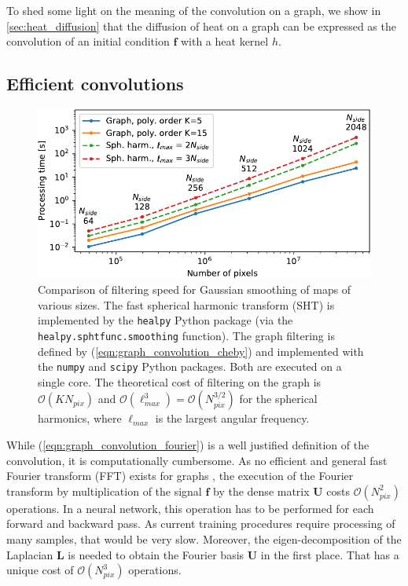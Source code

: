 \documentclass[final,twocolumn,3p,times,sort&compress]{elsarticle}
\newcommand{\eqnref}[1]{(\ref{eqn:#1})}
\renewcommand{\b}[1]{{\bm{#1}}}   %
\newcommand{\1}{\b{1}}              %
\newcommand{\0}{\b{0}}              %
\renewcommand{\L}{\b{L}}
\newcommand{\U}{\b{U}}
\newcommand{\f}{\b{f}}
\newcommand{\bO}{\mathcal{O}}
\begin{document}
To shed some light on the meaning of the convolution on a graph, we show in \ref{sec:heat_diffusion} that the diffusion of heat on a graph can be expressed as the convolution of an initial condition $\f$ with a heat kernel $h$.

\subsection{Efficient convolutions}
\label{sec:efficient_convolution}

\begin{figure}[t!]
    \centering
    \includegraphics[width=\linewidth]{filtering_speed}
    \caption{Comparison of filtering speed for Gaussian smoothing of maps of various sizes.
    The fast spherical harmonic transform (SHT) is implemented by the \texttt{healpy} Python package (via the \texttt{healpy.sphtfunc.smoothing} function).
    The graph filtering is defined by \eqnref{graph_convolution_cheby} and implemented with the \texttt{numpy} and \texttt{scipy} Python packages.
    Both are executed on a single core.
	The theoretical cost of filtering on the graph is $\bO(K N_{pix})$ and $\bO(\ell_{max}^3) = \bO(N_{pix}^{3/2})$ for the spherical harmonics, where $\ell_{max}$ is the largest angular frequency.}
    \label{fig:filtering_speed}
\end{figure}

While \eqnref{graph_convolution_fourier} is a well justified definition of the convolution, it is computationally cumbersome.
As no efficient and general fast Fourier transform (FFT) exists for graphs \citep{le2018fgft}, the execution of the Fourier transform by multiplication of the signal $\f$ by the dense matrix $\U$ costs $\bO(N_{pix}^2)$ operations.
In a neural network, this operation has to be performed for each forward and backward pass.
As current training procedures require processing of many samples, that would be very slow.
Moreover, the eigen-decomposition of the Laplacian $\L$ is needed to obtain the Fourier basis $\U$ in the first place.
That has a unique cost of $\bO(N_{pix}^3)$ operations.
\end{document}
